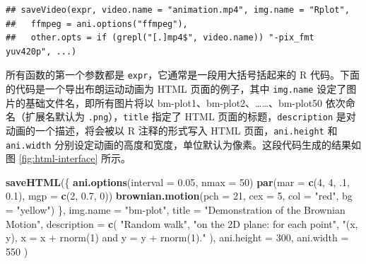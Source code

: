 \documentclass[
  b5paper,
  UTF8,twoside]{book}
\newenvironment{Shaded}{\begin{snugshade}}{\end{snugshade}}
\newcommand{\AttributeTok}[1]{\textcolor[rgb]{0.13,0.29,0.53}{#1}}
\newcommand{\DecValTok}[1]{\textcolor[rgb]{0.00,0.00,0.81}{#1}}
\newcommand{\FloatTok}[1]{\textcolor[rgb]{0.00,0.00,0.81}{#1}}
\newcommand{\FunctionTok}[1]{\textcolor[rgb]{0.13,0.29,0.53}{\textbf{#1}}}
\newcommand{\NormalTok}[1]{#1}
\newcommand{\StringTok}[1]{\textcolor[rgb]{0.31,0.60,0.02}{#1}}
\begin{document}
\begin{verbatim}
## saveVideo(expr, video.name = "animation.mp4", img.name = "Rplot",
##   ffmpeg = ani.options("ffmpeg"),
##   other.opts = if (grepl("[.]mp4$", video.name)) "-pix_fmt yuv420p", ...)
\end{verbatim}

所有函数的第一个参数都是 \texttt{expr}，它通常是一段用大括号括起来的 R 代码。下面的代码是一个导出布朗运动动画为 HTML 页面的例子，其中 \texttt{img.name} 设定了图片的基础文件名，即所有图片将以 bm-plot1、bm-plot2、\ldots\ldots、bm-plot50 依次命名（扩展名默认为 \texttt{.png}），\texttt{title} 指定了 HTML 页面的标题，\texttt{description} 是对动画的一个描述，将会被以 R 注释的形式写入 HTML 页面，\texttt{ani.height} 和 \texttt{ani.width} 分别设定动画的高度和宽度，单位默认为像素。这段代码生成的结果如图 \ref{fig:html-interface} 所示。

\begin{Shaded}
\begin{Highlighting}[]
\FunctionTok{saveHTML}\NormalTok{(\{}
  \FunctionTok{ani.options}\NormalTok{(}\AttributeTok{interval =} \FloatTok{0.05}\NormalTok{, }\AttributeTok{nmax =} \DecValTok{50}\NormalTok{)}
  \FunctionTok{par}\NormalTok{(}\AttributeTok{mar =} \FunctionTok{c}\NormalTok{(}\DecValTok{4}\NormalTok{, }\DecValTok{4}\NormalTok{, .}\DecValTok{1}\NormalTok{, }\FloatTok{0.1}\NormalTok{), }\AttributeTok{mgp =} \FunctionTok{c}\NormalTok{(}\DecValTok{2}\NormalTok{, }\FloatTok{0.7}\NormalTok{, }\DecValTok{0}\NormalTok{))}
  \FunctionTok{brownian.motion}\NormalTok{(}\AttributeTok{pch =} \DecValTok{21}\NormalTok{, }\AttributeTok{cex =} \DecValTok{5}\NormalTok{, }\AttributeTok{col =} \StringTok{"red"}\NormalTok{, }\AttributeTok{bg =} \StringTok{"yellow"}\NormalTok{)}
\NormalTok{\},}
\AttributeTok{img.name =} \StringTok{"bm{-}plot"}\NormalTok{,}
\AttributeTok{title =} \StringTok{"Demonstration of the Brownian Motion"}\NormalTok{,}
\AttributeTok{description =} \FunctionTok{c}\NormalTok{(}
  \StringTok{"Random walk"}\NormalTok{, }\StringTok{"on the 2D plane: for each point"}\NormalTok{,}
  \StringTok{"(x, y), x = x + rnorm(1) and y = y + rnorm(1)."}
\NormalTok{), }\AttributeTok{ani.height =} \DecValTok{300}\NormalTok{, }\AttributeTok{ani.width =} \DecValTok{550}
\NormalTok{)}
\end{Highlighting}
\end{Shaded}
\end{document}
